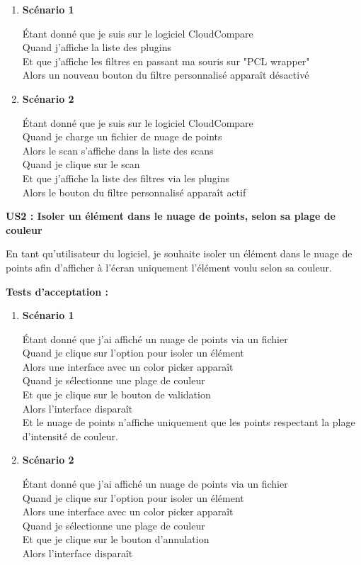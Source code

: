 \documentclass[12pt,titlepage,french]{article}
\begin{document}
\begin{enumerate}
    \item \textbf{Scénario 1}

Étant donné que je suis sur le logiciel CloudCompare\\
Quand j'affiche la liste des plugins\\
Et que j'affiche les filtres en passant ma souris sur "PCL wrapper" \\
Alors un nouveau bouton du filtre personnalisé apparaît désactivé

    \item \textbf{Scénario 2}

Étant donné que je suis sur le logiciel CloudCompare\\
Quand je charge un fichier de nuage de points\\
Alors le scan s'affiche dans la liste des scans\\
Quand je clique sur le scan\\
Et que j'affiche la liste des filtres via les plugins\\
Alors le bouton du filtre personnalisé apparaît actif\\

\end{enumerate}

\textbf{\og US2 : Isoler un élément dans le nuage de points, selon sa plage de couleur\fg{}}

En tant qu'utilisateur du logiciel, je souhaite isoler un élément dans le nuage de points afin d'afficher à l'écran uniquement l'élément voulu selon sa couleur.

\textbf{Tests d'acceptation :}
\begin{enumerate}

    \item \textbf{Scénario 1}

Étant donné que j'ai affiché un nuage de points via un fichier\\
Quand je clique sur l'option pour isoler un élément\\
Alors une interface avec un color picker apparaît\\
Quand je sélectionne une plage de couleur\\
Et que je clique sur le bouton de validation\\
Alors l'interface disparaît\\
Et le nuage de points n'affiche uniquement que les points respectant la plage d'intensité de couleur.

    \item \textbf{Scénario 2}

Étant donné que j'ai affiché un nuage de points via un fichier\\
Quand je clique sur l'option pour isoler un élément\\
Alors une interface avec un color picker apparaît\\
Quand je sélectionne une plage de couleur\\
Et que je clique sur le bouton d'annulation\\
Alors l'interface disparaît\\
\end{enumerate}
\end{document}
